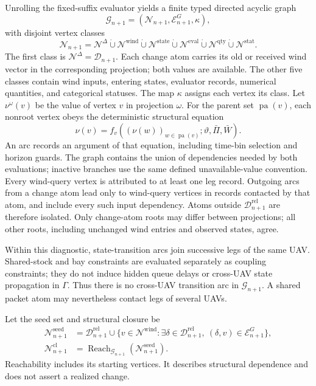 Unrolling the fixed-suffix evaluator yields a finite typed directed acyclic
graph
\begin{equation}
\mathcal G_{n+1}
=(\mathcal N_{n+1},\mathcal E_{n+1}^{G},\kappa),
\label{eq:dependency_graph}
\end{equation}
with disjoint vertex classes
\begin{equation}
\mathcal N_{n+1}
=\mathcal N^\Delta\mathbin{\dot\cup}\mathcal N^{\mathrm{wind}}
\mathbin{\dot\cup}\mathcal N^{\mathrm{state}}
\mathbin{\dot\cup}\mathcal N^{\mathrm{eval}}
\mathbin{\dot\cup}\mathcal N^{\mathrm{qty}}
\mathbin{\dot\cup}\mathcal N^{\mathrm{stat}}.
\label{eq:typed_vertices}
\end{equation}
The first class is $\mathcal N^\Delta=\mathcal D_{n+1}$.
Each change atom carries its old or received wind vector in the
corresponding projection; both values are available.
The other five classes contain wind inputs, entering states,
evaluator records, numerical quantities, and categorical statuses.
The map $\kappa$ assigns each vertex its class. Let $\nu^\omega(v)$ be
the value of vertex $v$ in projection $\omega$.
For the parent set $\operatorname{pa}(v)$, each nonroot vertex obeys the
deterministic structural equation
\begin{equation}
\nu(v)=f_v((\nu(w))_{w\in\operatorname{pa}(v)};
\vartheta,\bar\Pi,\bar W).
\label{eq:structural_equation}
\end{equation}
An arc records an argument of that equation, including time-bin selection
and horizon guards. The graph contains the union of dependencies needed by
both evaluations; inactive branches use the same defined unavailable-value
convention. Every wind-query vertex is attributed to at least one
leg record. Outgoing arcs from a change atom lead only to wind-query
vertices in records contacted by that atom, and include every such input
dependency. Atoms outside $\mathcal D_{n+1}^{\mathrm{rel}}$ are therefore
isolated. Only change-atom roots may differ between projections; all other
roots, including unchanged wind entries and observed states, agree.

Within this diagnostic, state-transition arcs join successive legs of the
same UAV. Shared-stock and bay constraints are evaluated separately as
coupling constraints; they do not induce hidden queue delays or cross-UAV
state propagation in $\Gamma$. Thus there is no cross-UAV transition arc
in $\mathcal G_{n+1}$. A shared packet atom may nevertheless contact legs of
several UAVs.

Let the seed set and structural closure be
\begin{align}
\mathcal N_{n+1}^{\mathrm{seed}}
&=\mathcal D_{n+1}^{\mathrm{rel}}
\cup\{v\in\mathcal N^{\mathrm{wind}}:
\exists\delta\in\mathcal D_{n+1}^{\mathrm{rel}},\ (\delta,v)\in
\mathcal E_{n+1}^{G}\},
\label{eq:seed_set}\\
\mathcal N_{n+1}^{\mathrm{cl}}
&=\operatorname{Reach}_{\mathcal G_{n+1}}
  (\mathcal N_{n+1}^{\mathrm{seed}}).
\label{eq:structural_closure}
\end{align}
Reachability includes its starting vertices. It describes structural
dependence and does not assert a realized change.

